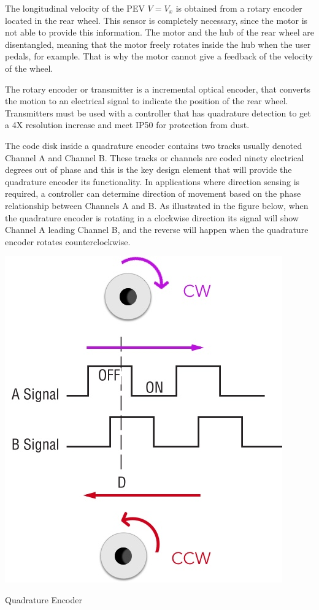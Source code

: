 The longitudinal velocity of the PEV $V=V_{x}$ is obtained from a rotary encoder located in the rear wheel. This sensor is completely necessary, since the motor is not able to provide this information. The motor and the hub of the rear wheel are disentangled, meaning that the motor freely rotates inside the hub when the user pedals, for example. That is why the motor cannot give a feedback of the velocity of the wheel.

The rotary encoder or transmitter\cite{rotary} is a incremental optical encoder, that converts the motion to an electrical signal to indicate the position of the rear wheel. Transmitters must be used with a controller that has quadrature detection to get a 4X resolution increase and meet IP50 for protection from dust.

The code disk inside a quadrature encoder contains two tracks usually denoted Channel A and Channel B. These tracks or channels are coded ninety electrical degrees out of phase and this is the key design element that will provide the quadrature encoder its functionality. In applications where direction sensing is required, a controller can determine direction of movement based on the phase relationship between Channels A and B. As illustrated in the figure below, when the quadrature encoder is rotating in a clockwise direction its signal will show Channel A leading Channel B, and the reverse will happen when the quadrature encoder rotates counterclockwise.

\begin{marginfigure}
	\includegraphics[width=1\linewidth]{figs/05/encoder}
	\caption{Quadrature Encoder}
\end{marginfigure}

